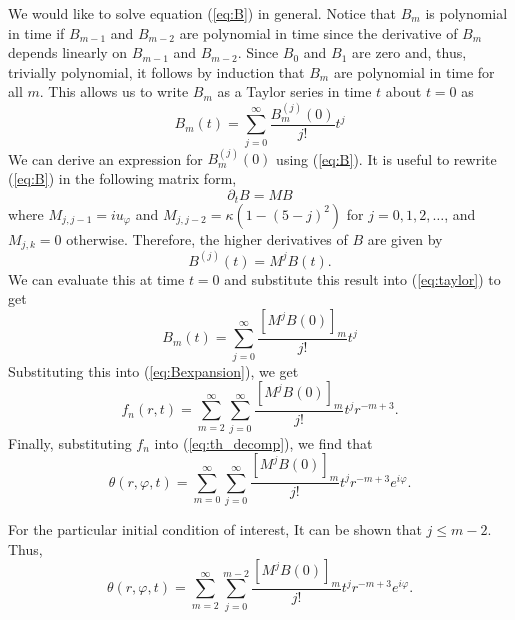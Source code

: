 We would like to solve equation (\ref{eq:B}) in general. Notice that $B_{m}$ is polynomial in time if $B_{m-1}$ and $B_{m-2}$ are polynomial in time since the derivative of $B_{m}$ depends linearly on $B_{m-1}$ and $B_{m-2}$. Since $B_{0}$ and $B_{1}$ are zero and, thus, trivially polynomial, it follows by induction that $B_{m}$ are polynomial in time for all $m$. This allows us to write $B_{m}$ as a Taylor series in time $t$ about $t=0$ as
\begin{equation}
\label{eq:taylor}
B_{m}(t)=\sum_{j=0}^{\infty}\frac{B_{m}^{(j)}(0)}{j!}t^{j}
\end{equation}
We  can derive an expression for $B_{m}^{(j)}(0)$ using (\ref{eq:B}). It is useful to rewrite (\ref{eq:B}) in the following matrix form,
\begin{equation}
\partial_{t}B=MB
\end{equation}
where $M_{j,j-1}=iu_{\varphi}$ and $M_{j,j-2}=\kappa(1-(5-j)^2)$ for $j = 0,1, 2, \dots $, and $M_{j,k}=0$ otherwise. Therefore, the higher derivatives of $B$ are given by 
\begin{equation}
B^{(j)}(t)=M^{j}B(t).
\end{equation} 
We can evaluate this at time $t=0$ and substitute this result into (\ref{eq:taylor}) to get
\begin{equation}
\label{eq:taylor2}
B_{m}(t)=\sum_{j=0}^{\infty}\frac{[M^{j}B(0)]_{m}}{j!}t^{j}
\end{equation}
Substituting this into (\ref{eq:Bexpansion}), we get
\begin{equation}
f_{n}(r,t)=\sum_{m=2}^{\infty}\sum_{j=0}^{\infty}\frac{[M^{j}B(0)]_{m}}{j!}t^{j}r^{-m+3}.
\end{equation}
Finally, substituting $f_{n}$ into (\ref{eq:th_decomp}), we find that 
\begin{equation}
\theta(r,\varphi,t)=\sum_{m=0}^{\infty}\sum_{j=0}^{\infty}\frac{[M^{j}B(0)]_{m}}{j!}t^{j}r^{-m+3}e^{i\varphi}.
\end{equation}

For the particular initial condition of interest, It can be shown that 
$j \leq m-2$. Thus,
\begin{equation}
\theta(r,\varphi,t)=\sum_{m=2}^{\infty}\sum_{j=0}^{m-2}\frac{[M^{j}B(0)]_{m}}{j!}t^{j}r^{-m+3}e^{i\varphi}.
\end{equation}


